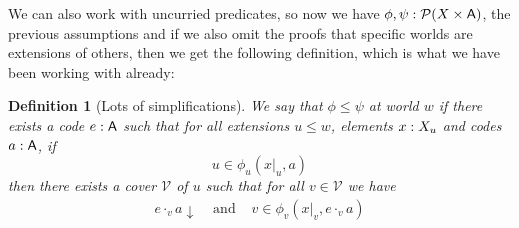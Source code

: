 \documentclass[11pt]{article}
\newtheorem{defn}[thrm]{Definition}
\begin{document}
We can also work with uncurried predicates, so now we have
\(\phi,\psi : \mathcal{P}{(X\times\mathsf{A})}\), the previous assumptions and if we
also omit the proofs that specific worlds are extensions of others, then
we get the following definition, which is what we have been working with
already:
%
\begin{defn}[Lots of simplifications]
  We say that \(\phi \leq \psi\) at world \(w\) if there exists a code
  \(e : \mathsf{A}\) such that for all extensions \(u \leq w\), elements
  \(x : X_{u}\) and codes \(a : \mathsf{A}\), if
  \[
    u \in \phi_{u}(x|_{u}, a)
  \]
  then there exists a cover \(\mathcal{V}\) of \(u\) such that for all \(v \in \mathcal{V}\) we
  have
  \[\begin{array}{ccc}
    e \cdot_{v} a \downarrow &\text{ and }&
    v \in \phi_{v}(x|_{v}, e \cdot_{v} a)
  \end{array}\]
\end{defn}

\newpage
\printbibliography{}
\end{document}
